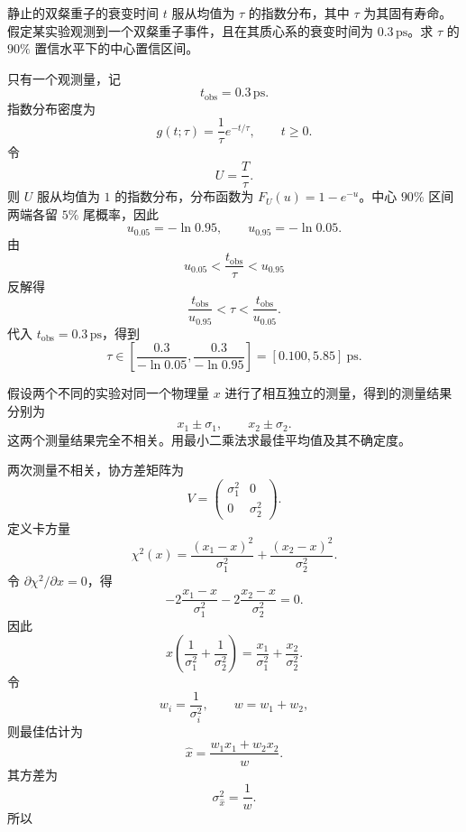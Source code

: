 \begin{question}
静止的双粲重子的衰变时间 $t$ 服从均值为 $\tau$ 的指数分布，其中 $\tau$ 为其固有寿命。假定某实验观测到一个双粲重子事件，且在其质心系的衰变时间为 $0.3\,\mathrm{ps}$。求 $\tau$ 的 $90\%$ 置信水平下的中心置信区间。
\begin{solution}
只有一个观测量，记
\[
t_{\mathrm{obs}}=0.3\,\mathrm{ps}.
\]
指数分布密度为
\[
g(t;\tau)=\frac1\tau e^{-t/\tau},\qquad t\ge0.
\]
令
\[
U=\frac{T}{\tau}.
\]
则 $U$ 服从均值为 $1$ 的指数分布，分布函数为 $F_U(u)=1-e^{-u}$。中心 $90\%$ 区间两端各留 $5\%$ 尾概率，因此
\[
u_{0.05}=-\ln0.95,
\qquad
u_{0.95}=-\ln0.05.
\]
由
\[
u_{0.05}<\frac{t_{\mathrm{obs}}}{\tau}<u_{0.95}
\]
反解得
\[
\frac{t_{\mathrm{obs}}}{u_{0.95}}<\tau<\frac{t_{\mathrm{obs}}}{u_{0.05}}.
\]
代入 $t_{\mathrm{obs}}=0.3\,\mathrm{ps}$，得到
\[
\tau\in\left[\frac{0.3}{-\ln0.05},\frac{0.3}{-\ln0.95}\right]
=[0.100,5.85]~\mathrm{ps}.
\]
\end{solution}
\end{question}

\begin{question}
假设两个不同的实验对同一个物理量 $x$ 进行了相互独立的测量，得到的测量结果分别为
\[
x_1\pm\sigma_1,
\qquad
x_2\pm\sigma_2.
\]
这两个测量结果完全不相关。用最小二乘法求最佳平均值及其不确定度。
\begin{solution}
两次测量不相关，协方差矩阵为
\[
V=\begin{pmatrix}
\sigma_1^2&0\\
0&\sigma_2^2
\end{pmatrix}.
\]
定义卡方量
\[
\chi^2(x)=\frac{(x_1-x)^2}{\sigma_1^2}
+\frac{(x_2-x)^2}{\sigma_2^2}.
\]
令 $\partial\chi^2/\partial x=0$，得
\[
-2\frac{x_1-x}{\sigma_1^2}
-2\frac{x_2-x}{\sigma_2^2}=0.
\]
因此
\[
x\left(\frac1{\sigma_1^2}+\frac1{\sigma_2^2}\right)
=\frac{x_1}{\sigma_1^2}+\frac{x_2}{\sigma_2^2}.
\]
令
\[
w_i=\frac1{\sigma_i^2},\qquad w=w_1+w_2,
\]
则最佳估计为
\[
\hat x=\frac{w_1x_1+w_2x_2}{w}.
\]
其方差为
\[
\sigma_{\hat x}^2=\frac1w.
\]
所以
\end{solution}
\end{question}


